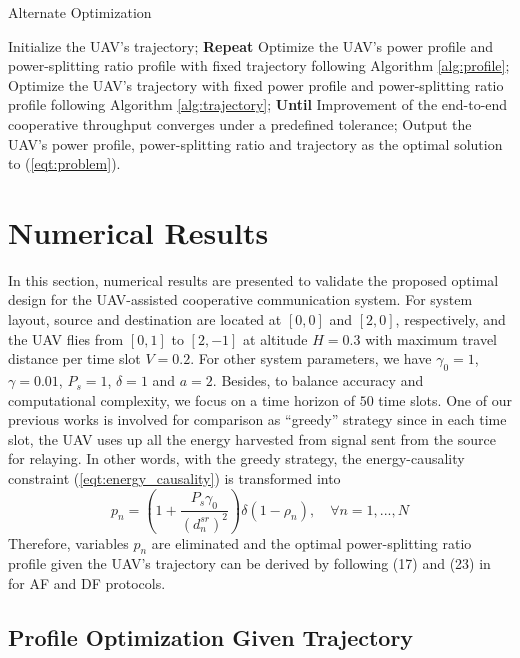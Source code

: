 \documentclass[12pt, draftclsnofoot, onecolumn]{IEEEtran}
\begin{document}
\begin{algorithm}[htb] 
\caption{Alternate Optimization}\label{alg:alternate_optimize}
\begin{algorithmic}[1]
\STATE Initialize the UAV's trajectory;
\STATE \textbf{Repeat}
\STATE \quad Optimize the UAV's power profile and power-splitting ratio profile with fixed trajectory following Algorithm \ref{alg:profile};
\STATE \quad Optimize the UAV's trajectory with fixed power profile and power-splitting ratio profile following Algorithm \ref{alg:trajectory};
\STATE \textbf{Until} Improvement of the end-to-end cooperative throughput converges under a predefined tolerance;
\STATE Output the UAV's power profile, power-splitting ratio and trajectory as the optimal solution to (\ref{eqt:problem}).
\end{algorithmic}
\end{algorithm}

\section{Numerical Results}
In this section, numerical results are presented to validate the proposed optimal design for the UAV-assisted cooperative communication system.  For system layout, source and destination are located at $[0,0]$ and $[2,0]$, respectively, and the UAV flies from $[0,1]$ to $[2,-1]$ at altitude $H=0.3$ with maximum travel distance per time slot $V=0.2$. For other system parameters, we have $\gamma_{0}=1$, $\gamma=0.01$, $P_{s}=1$, $\delta =1$ and $a=2$. Besides, to balance accuracy and computational complexity, we focus on a time horizon of $50$ time slots. One of our previous works is involved for comparison as ``greedy'' strategy since in each time slot, the UAV uses up all the energy harvested from signal sent from the source for relaying\cite{7417077}. In other words, with the greedy strategy, the energy-causality constraint (\ref{eqt:energy_causality}) is transformed into
\begin{equation}\label{eqt:greedy}
p_{n}=(1+\dfrac{P_{s}\gamma_{0}}{(d^{sr}_{n})^{2}})\delta(1-\rho_{n}),\quad \forall n=1,...,N
\end{equation}
Therefore, variables $p_{n}$ are eliminated and the optimal power-splitting ratio profile given the UAV's trajectory can be derived by following (17) and (23) in \cite{7417077} for AF and DF protocols.

\subsection{Profile Optimization Given Trajectory}
\end{document}
